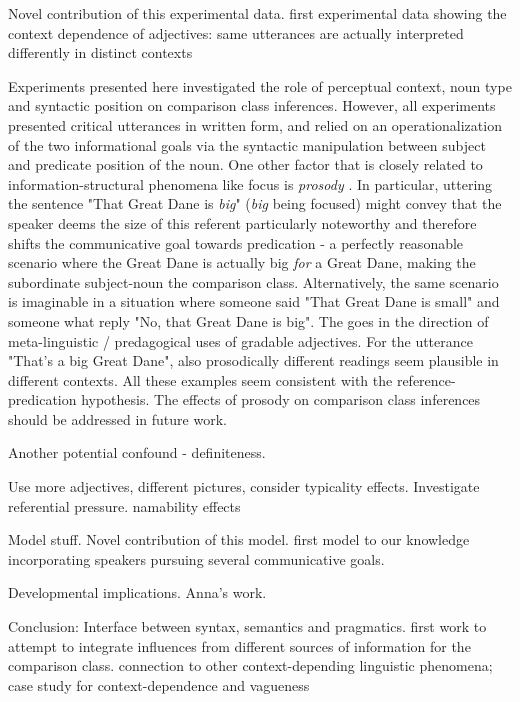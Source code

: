 Novel contribution of this experimental data. first experimental data showing the context dependence of adjectives: same utterances are actually interpreted differently in distinct contexts

Experiments presented here investigated the role of perceptual context, noun type and syntactic position on comparison class inferences. However, all experiments presented critical utterances in written form, and relied on an operationalization of the two informational goals via the syntactic manipulation between subject and predicate position of the noun. One other factor that is closely related to information-structural phenomena like focus is \emph{prosody} \parencite{krifka2008basic}. In particular, uttering the sentence "That Great Dane is \emph{big}" (\emph{big} being focused) might convey that the speaker deems the size of this referent particularly noteworthy and therefore shifts the communicative goal towards predication - a perfectly reasonable scenario where the Great Dane is actually big \emph{for} a Great Dane, making the subordinate subject-noun the comparison class.  Alternatively, the same scenario is imaginable in a situation where someone said "That Great Dane is small" and someone what reply "No, that Great Dane is big". The goes in the direction of meta-linguistic / predagogical uses of gradable adjectives. For the utterance "That's a big Great Dane", also prosodically different readings seem plausible in different contexts. 
All these examples seem consistent with the reference-predication hypothesis.
The effects of prosody on comparison class inferences should be addressed in future work. 

Another potential confound - definiteness. 

Use more adjectives, different pictures, consider typicality effects. Investigate referential pressure. namability effects 

Model stuff. 
Novel contribution of this model.   
first model to our knowledge incorporating speakers pursuing several communicative goals. 


Developmental implications. Anna's work.

Conclusion: Interface between syntax, semantics and pragmatics. first work to attempt to integrate influences from different sources of information for the comparison class. connection to other context-depending linguistic phenomena; case study for context-dependence and vagueness
